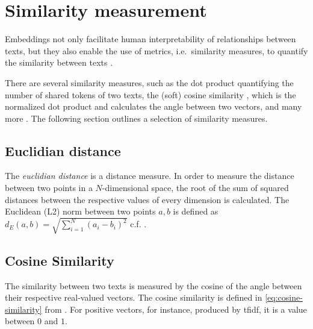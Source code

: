\section{Similarity measurement}\label{sec:similarity-measurement}

Embeddings not only facilitate human interpretability of relationships between texts, 
but they also enable the use of metrics, i.e.\ similarity measures, to quantify the similarity between texts \cite{IR2011, euclidean_l2_norm2015}.

There are several similarity measures, such as the dot product quantifying the number of shared tokens of two texts, 
the (soft) cosine similarity \cite{soft_cosine2014, soft_cosine2017}, which is the normalized dot product and calculates the angle between two vectors, 
and many more \cite{IR2011, euclidean_l2_norm2015, HfsentTrans2019}.
The following section outlines a selection of similarity measures.


\subsection{Euclidian distance}\label{subsec:euclidian-distance}

The \textit{euclidian distance} is a distance measure.
In order to measure the distance between two points in a $N$-dimensional space, 
the root of the sum of squared distances between the respective values of every dimension is calculated.
The Euclidean (L2) norm between two points $a, b$ is defined as $d_E(a,b) = \sqrt{\sum_{i=1}^{N}(a_i - b_i)^2}$ c.f. \cite{euclidean_l2_norm2015}.


\subsection{Cosine Similarity}\label{subsec:cosine-similarity}


The similarity between two texts is measured by the cosine of the angle between their respective real-valued vectors.
The cosine similarity is defined in \autoref{eq:cosine-similarity} from \cite{soft_cosine2014}.
For positive vectors, for instance, produced by \ac{tfidf}, it is a value between $0$ and $1$.

